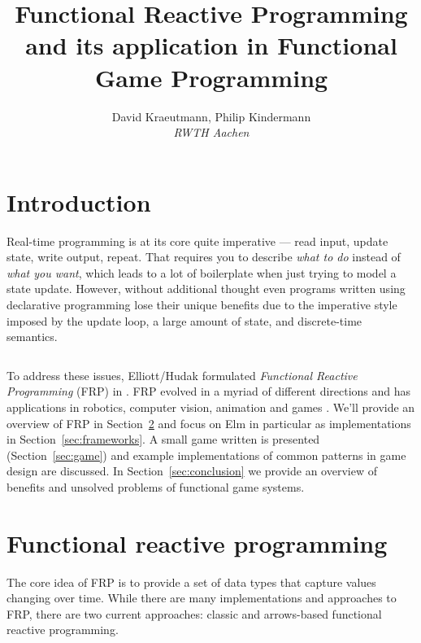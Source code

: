 \documentclass[pdftex,a4paper]{extarticle}
\title{Functional Reactive Programming and its application in Functional Game Programming}
\author{{\large David Kraeutmann, Philip Kindermann} \\
{\em RWTH Aachen}}
\begin{document}
\maketitle

\section{Introduction}
Real-time programming is at its core quite imperative --- read input, update state, write output, repeat. 
That requires you to describe \emph{what to do} instead of \emph{what you want}, which leads to a lot of boilerplate when just trying to model a state update.
However, without additional thought even programs written using declarative programming lose their unique benefits due to the imperative style imposed by the update loop, a large amount of state, and discrete-time semantics. 
\begin{listing}[ht]
\inputminted[breaklines=true]{haskell}{Loop.hs}
\label{lst:imperative}
\end{listing}

To address these issues, Elliott/Hudak formulated \emph{Functional Reactive Programming} (FRP) in \cite{ElliottHudak97:Fran}. FRP evolved in a myriad of different directions and has  applications in robotics, computer vision, animation and games \cite{haskell-wiki-yampa}. 
We'll provide an overview of FRP in Section~\ref{sec:frp}
and focus on Elm in particular as implementations in Section~\ref{sec:frameworks}.
A small game written is presented (Section~\ref{sec:game}) and example implementations of common patterns in game design are discussed.
In Section~\ref{sec:conclusion} we provide an overview of benefits and unsolved problems of functional game systems.


\section{Functional reactive programming}
\label{sec:frp}
The core idea of FRP is to provide a set of data types that capture values changing over time. While there are many implementations and approaches to FRP, there are two current approaches: classic and arrows-based functional reactive programming. 
\end{document}
